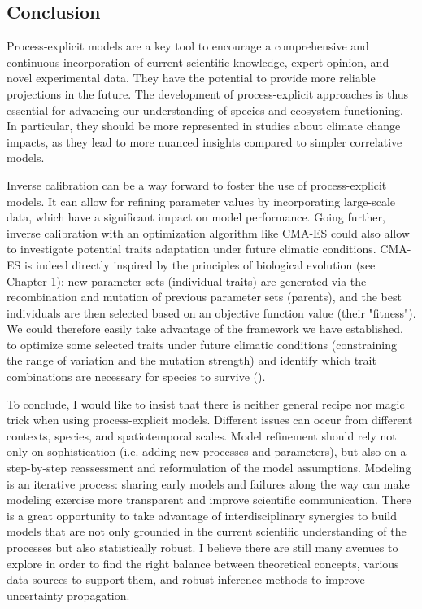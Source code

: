 \subsection{Conclusion}

Process-explicit models are a key tool to encourage a comprehensive and continuous incorporation of current scientific knowledge, expert opinion, and novel experimental data. They have the potential to provide more reliable projections in the future. The development of process-explicit approaches is thus essential for advancing our understanding of species and ecosystem functioning. In particular, they should be more represented in studies about climate change impacts, as they lead to more nuanced insights compared to simpler correlative models.

Inverse calibration can be a way forward to foster the use of process-explicit models. It can allow for refining parameter values by incorporating large-scale data, which have a significant impact on model performance.
Going further, inverse calibration with an optimization algorithm like CMA-ES could also allow to investigate potential traits adaptation under future climatic conditions. CMA-ES is indeed directly inspired by the principles of biological evolution (see Chapter 1): new parameter sets (individual traits) are generated via the recombination and mutation of previous parameter sets (parents), and the best individuals are then selected based on an objective function value (their "fitness"). 
We could therefore easily take advantage of the framework we have established, to optimize some selected traits under future climatic conditions (constraining the range of variation and the mutation strength) and identify which trait combinations are necessary for species to survive (). 

To conclude, I would like to insist that there is neither general recipe nor magic trick when using process-explicit models.
Different issues can occur from different contexts, species, and spatiotemporal scales.
Model refinement should rely not only on sophistication (i.e. adding new processes and parameters), but also on a step-by-step reassessment and reformulation of the model assumptions. Modeling is an iterative process: sharing early models and failures along the way can make modeling exercise more transparent and improve scientific communication.
There is a great opportunity to take advantage of interdisciplinary synergies to build models that are not only grounded in the current scientific understanding of the processes but also statistically robust.
I believe there are still many avenues to explore in order to find the right balance between theoretical concepts, various data sources to support them, and robust inference methods to improve uncertainty propagation.


